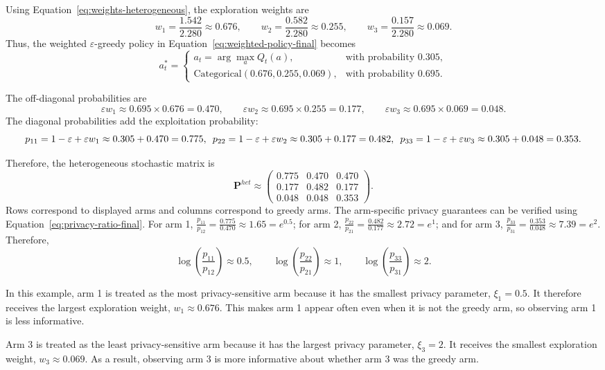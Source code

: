 \documentclass[mksc,nonblindrev]{informs3}
\begin{document}
\begin{APPENDICES}
Using Equation~\eqref{eq:weights-heterogeneous}, the exploration weights are
\[
w_1=\frac{1.542}{2.280}\approx0.676,\qquad
w_2=\frac{0.582}{2.280}\approx0.255,\qquad
w_3=\frac{0.157}{2.280}\approx0.069.
\]
Thus, the weighted $\varepsilon$-greedy policy in Equation~\eqref{eq:weighted-policy-final} becomes
\[
a_t^*
=
\begin{cases}
a_t=\arg\max_a Q_t(a), & \text{with probability } 0.305,\\
\text{Categorical}(0.676,0.255,0.069), & \text{with probability } 0.695.
\end{cases}
\]

The off-diagonal probabilities are
\[
\varepsilon w_1\approx0.695\times0.676=0.470,\qquad
\varepsilon w_2\approx0.695\times0.255=0.177,\qquad
\varepsilon w_3\approx0.695\times0.069=0.048.
\]
The diagonal probabilities add the exploitation probability:
\[
p_{11}=1-\varepsilon+\varepsilon w_1\approx0.305+0.470=0.775,\hspace{.5em}
p_{22}=1-\varepsilon+\varepsilon w_2\approx0.305+0.177=0.482,\hspace{.5em}
p_{33}=1-\varepsilon+\varepsilon w_3\approx0.305+0.048=0.353.
\]

Therefore, the heterogeneous stochastic matrix is
\[
\mathbf P^{het}
\approx
\begin{pmatrix}
0.775 & 0.470 & 0.470 \\
0.177 & 0.482 & 0.177 \\
0.048 & 0.048 & 0.353
\end{pmatrix}.
\]
Rows correspond to displayed arms and columns correspond to greedy arms. The arm-specific privacy guarantees can be verified using Equation~\eqref{eq:privacy-ratio-final}. For arm 1, $\frac{p_{11}}{p_{12}}=\frac{0.775}{0.470}\approx1.65=e^{0.5}$; for arm 2, $\frac{p_{22}}{p_{21}}=\frac{0.482}{0.177}\approx2.72=e^1$; and for arm 3, $\frac{p_{33}}{p_{31}}=\frac{0.353}{0.048}\approx7.39=e^2$.
Therefore,
\[
\log\left(\frac{p_{11}}{p_{12}}\right)\approx 0.5,
\qquad
\log\left(\frac{p_{22}}{p_{21}}\right)\approx 1,
\qquad
\log\left(\frac{p_{33}}{p_{31}}\right)\approx 2.
\]

In this example, arm 1 is treated as the most privacy-sensitive arm because it has the smallest privacy parameter, $\xi_1=0.5$. It therefore receives the largest exploration weight, $w_1\approx 0.676$. This makes arm 1 appear often even when it is not the greedy arm, so observing arm 1 is less informative.

Arm 3 is treated as the least privacy-sensitive arm because it has the largest privacy parameter, $\xi_3=2$. It receives the smallest exploration weight, $w_3\approx 0.069$. As a result, observing arm 3 is more informative about whether arm 3 was the greedy arm.


\end{APPENDICES}
\end{document}
